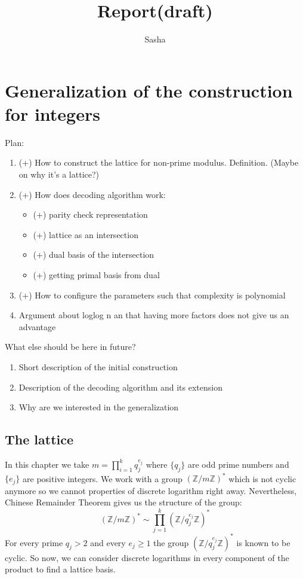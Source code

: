 \documentclass[12pt]{article}
\title{Report(draft)}
\author{ Sasha }
\newcommand{\ZZ}{\mathbb{Z}}
\def\added{\bgroup \markoverwith{\textcolor{green!50!blue}{\lower4.5pt\hbox{\sixly \char58}}}\ULon}
\def\toimprove{\bgroup \markoverwith{\textcolor{red}{\lower4.5pt\hbox{\sixly \char58}}}\ULon}
\begin{document}
\maketitle

\section{Generalization of the construction for integers}
Plan:
\begin{enumerate}
    \item (+) How to construct the lattice for non-prime modulus. Definition. (Maybe on why it's a lattice?)
    \item (+) How does decoding algorithm work:
    \begin{itemize}
        \item (+) parity check representation
        \item (+) lattice as an intersection
        \item (+) dual basis of the intersection
        \item (+) getting primal basis from dual
    \end{itemize}
    \item (+) How to configure the parameters such that complexity is polynomial
    \item Argument about loglog n an that having more factors does not give us an advantage
\end{enumerate}

What else should be here in future?
\begin{enumerate}
    \item Short description of the initial construction
    \item Description of the decoding algorithm and its extension
    \item Why are we interested in the generalization
\end{enumerate}

\subsection{The lattice}
In this chapter we take $m = \prod_{i=1}^{k} q_{j}^{e_{j}}$ where $\{q_{j}\}$ are odd prime numbers and $\{e_{j}\}$ are positive integers. We work with a group $(\ZZ/m\ZZ)^*$ which is not cyclic anymore so we cannot \toimprove{deploy} properties of discrete logarithm right away. Nevertheless, \added{the} Chinese Remainder Theorem \added{(CRT)} gives us the structure of the group:
\begin{equation}
    (\ZZ/m\ZZ)^* \sim \prod_{j=1}^{k}(\ZZ/q_{j}^{e_{j}}\ZZ)^*
\end{equation}
For every prime $q_{j} > 2$ and every $e_{j} \geq 1$ the group $(\ZZ/q_{j}^{e_{j}}\ZZ)^*$ is known to be cyclic. So now, we can consider discrete logarithms in every component of the product to find a lattice basis.
\end{document}
